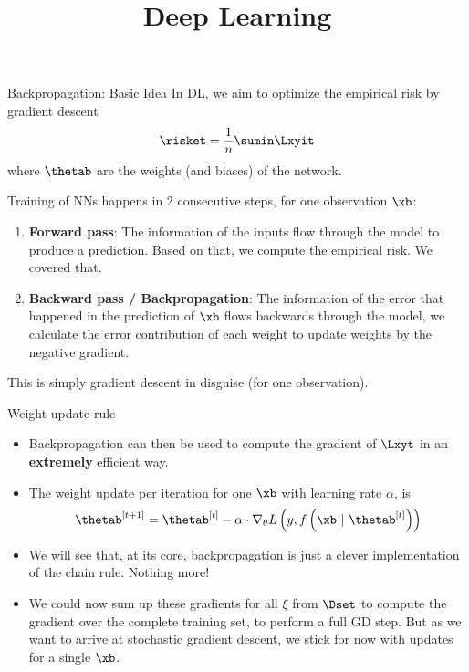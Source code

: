 




\newcommand{\titlefigure}{figure/backprop_gg_new.png}
\newcommand{\learninggoals}{
  \item Forward and backward passes
  \item Chain rule
  \item Inner computations of backpropagation
}

\title{Deep Learning}
\date{}




\begin{frame}{Backpropagation: Basic Idea}
In DL, we aim to optimize the empirical risk by gradient descent $$\risket = \frac{1}{n} \sumin \Lxyit$$ where $\thetab$ are the weights (and biases) of the network. 

Training of NNs happens in 2 consecutive steps, for one observation $\xb$:
\begin{enumerate}
\item \textbf{Forward pass}: The information of the inputs flow through the model to produce a prediction. Based on that, we compute the empirical risk. We covered that.
\item \textbf{Backward pass / Backpropagation}: The information of the error that happened in the prediction of $\xb$ flows backwards through the model, we calculate the error contribution of each weight to update weights by the negative gradient. 
\end{enumerate}
This is simply gradient descent in disguise (for one observation).
\end{frame}

\begin{vbframe}{Weight update rule}
  \begin{itemize}
    \item Backpropagation can then be used to compute the gradient of $\Lxyt$ in an \textbf{extremely} efficient way.
    \item The weight update per iteration for one $\xb$ with learning rate $\alpha$, is 
      $$\thetab^{[t+1]} = \thetab^{[t]} - \alpha \cdot \nabla_{\theta}L\left(y, f\left(\xb ~|~ \thetab^{[t]}\right)\right)$$ 
        \item We will see that, at its core, backpropagation is just a clever implementation of the chain rule. Nothing more!

  \item We could now sum up these gradients for all $\xi$ from $\Dset$ to compute the gradient over the complete training set, to perform a full GD step. But as we want to arrive at stochastic gradient descent, 
    we stick for now with updates for a single $\xb$.
  \end{itemize}
\end{vbframe}


